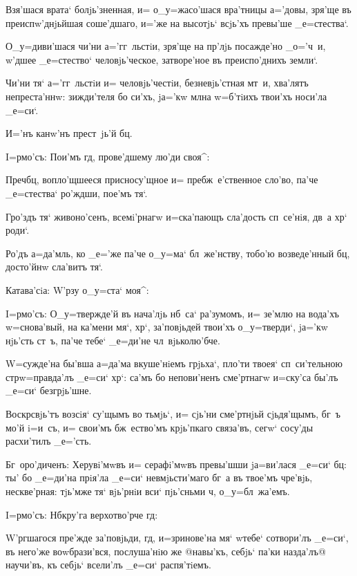 Взя'шася врата` болjь'зненная, и= о_у=жасо'шася 
вра'тницы а='довы, зря'ще въ преиспw'днjьйшая соше'дшаго, 
и='же на высотjь` всjь'хъ превы'ше _е=стества`.

О_у=диви'шася чи'ни а='гг~льстiи, зря'ще на пр'лjь 
посажде'но _о='ч~и, w'дшее _е=стество` 
человjь'ческое, затворе'ное въ преиспо'днихъ земли`.

Чи'ни тя` а='гг~льстiи и= человjь'честiи, 
безневjь'стная мт~и, хва'лятъ непреста'ннw: зижди'теля бо 
си'хъ, jа='кw мл на w=б'тiихъ твои'хъ носи'ла 
_е=си`.

И='нъ канw'нъ прест~jь'й бц.

I=рмо'съ: Пои'мъ гд, прове'дшему лю'ди своя^:

Преч бц, вопло'щшееся присносу'щное и= 
пребж~е'ственное сло'во, па'че _е=стества` ро'ждши, 
пое'мъ тя`.

Гро'здъ тя` живоно'сенъ, всемi'рнагw и=ска'пающъ 
сла'дость сп~се'нiя, дв~а хр` роди`.

Ро'дъ а=да'мль, ко _е='же па'че о_у=ма` бл~же'нству, 
тобо'ю возведе'нный бц, досто'йнw сла'витъ тя`.

Катава'сiа: W'рзу о_у=ста` моя^:


I=рмо'съ: О_у=твержде'й въ нача'лjь нб~са` ра'зумомъ, 
и= зе'млю на вода'хъ w=снова'вый, на ка'мени мя`, 
хр`, за'повjьдей твои'хъ о_у=тверди`, jа='кw нjь'сть 
ст~ъ, па'че тебе` _е=ди'не чл~вjьколю'бче.

W=сужде'на бы'вша а=да'ма вкуше'нiемъ грjьха`, пло'ти 
твоея` сп~си'тельною стр w=правда'лъ _е=си` хр`: 
са'мъ бо непови'ненъ сме'ртнагw и=ску'са бы'лъ _е=си` 
безгрjь'шне.

Воскр свjь'тъ возсiя` су'щымъ во тьмjь`, и= 
сjь'ни сме'ртнjьй сjьдя'щымъ, бг~ъ мо'й i=и~съ, и= 
свои'мъ бж~ество'мъ крjь'пкаго связа'въ, сегw` сосу'ды 
расхи'тилъ _е='сть.

Бг~оро'диченъ: Херувi'мwвъ и= серафi'мwвъ превы'шши 
jа=ви'лася _е=си` бц: ты' бо _е=ди'на прiя'ла _е=си` 
невмjьсти'маго бг~а въ твое'мъ чре'вjь, нескве'рная: 
тjь'мже тя` вjь'рнiи вси` пjь'сньми ч, 
о_у=бл~жа'емъ.

 I=рмо'съ: Нб кру'га верхотво'рче гд:

W'ргшагося пре'жде за'повjьди, гд, и=зринове'на 
мя` w\т тебе` сотвори'лъ _е=си`, въ него'же воwбрази'вся, 
послуша'нiю же @навы'къ, себjь` па'ки назда'лъ@ 
{научи'въ, къ себjь` всели'лъ} _е=си` распя'тiемъ.


